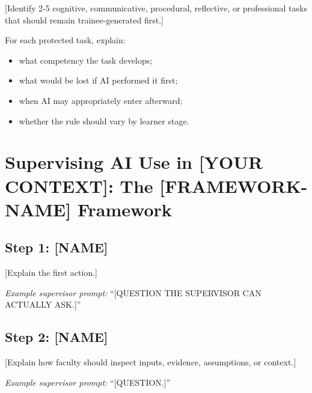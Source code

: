 \documentclass[12pt]{article}
\begin{document}
 [Identify 2-5 cognitive, communicative, procedural, reflective, or
  professional tasks that should remain trainee-generated first.]

For each protected task, explain:

\begin{itemize}
	\item what competency the task develops;
	\item what would be lost if AI performed it first;
	\item when AI may appropriately enter afterward;
	\item whether the rule should vary by learner stage.
\end{itemize}


\section*{Supervising AI Use in [YOUR CONTEXT]: The [FRAMEWORK-NAME] Framework}

%
%
%

\subsection*{Step 1: [NAME]}

[Explain the first action.]

\textit{Example supervisor prompt:}
``[QUESTION THE SUPERVISOR CAN ACTUALLY ASK.]''

\subsection*{Step 2: [NAME]}

[Explain how faculty should inspect inputs, evidence, assumptions, or
context.]

\textit{Example supervisor prompt:}
``[QUESTION.]''
\end{document}
